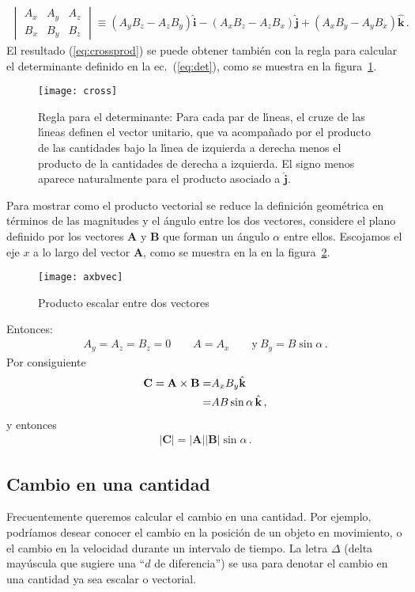 \begin{frame}
\begin{align}
\begin{vmatrix}
    A_x & A_y & A_z\\
    B_x & B_y & B_z
  \end{vmatrix}\equiv\left(A_yB_z-A_zB_y\right)\hat{\mathbf{i}}
-\left(A_xB_z-A_zB_x\right)\hat{\mathbf{j}}
+\left(A_xB_y-A_yB_x\right)\hat{\mathbf{k}}\,.
\end{align}
El resultado (\ref{eq:crossprod}) se puede obtener tambi\'en con la
regla para calcular el determinante definido en la ec.~(\ref{eq:det}),
como se muestra en la figura~\ref{fig:cross}.
\begin{figure}
  \centering
  \texttt{[image: cross]}
  \caption{Regla para el determinante: Para cada par de l\'\i neas, el cruze de las l\'\i neas definen
    el vector unitario, que va acompa\~nado por el producto de las
    cantidades bajo la l\'\i nea de izquierda  a derecha menos el producto
    de la cantidades de derecha a izquierda. El signo menos aparece
    naturalmente para el producto asociado a $\hat{\mathbf{j}}$.  }
  \label{fig:cross}
\end{figure}

Para mostrar como el producto vectorial se reduce la definici\'on
geom\'etrica en t\'erminos de las magnitudes y el \'angulo entre los dos
vectores, considere el plano definido por los vectores $\mathbf{A}$ y
$\mathbf{B}$ que forman un \'angulo $\alpha$ entre ellos. Escojamos el eje
$x$ a lo largo del vector $\mathbf{A}$, como se muestra en la en la figura~\ref{fig:axbvec}. 

\begin{figure}
  \centering
  \texttt{[image: axbvec]}
  \caption{Producto escalar entre dos vectores}
  \label{fig:axbvec}
\end{figure} 

Entonces:
\begin{align}
  A_y=A_z=B_z=0\qquad A=A_x\qquad\text{y}\ B_y=B\sin\alpha\,. 
\end{align}
Por consiguiente
\begin{align}
  \mathbf{C}=\mathbf{A}\times\mathbf{B}=&A_xB_y\hat{\mathbf{k}}\nonumber\\
  =&A B\sin\alpha\,\hat{\mathbf{k}}\,,
\end{align}
y entonces
\begin{align}
  |\mathbf{C}|=|\mathbf{A}||\mathbf{B}|\sin\alpha\,.
\end{align}
\end{frame}

\subsection{Cambio en una cantidad}

Frecuentemente queremos calcular el cambio en una cantidad. Por
ejemplo, podríamos desear conocer el cambio en la posición de un
objeto en movimiento, o el cambio en la velocidad durante un intervalo
de tiempo. La letra $\Delta$ (delta mayúscula que sugiere una ``$d$ de
diferencia'') se usa para denotar el cambio en una cantidad ya sea
escalar o vectorial.

